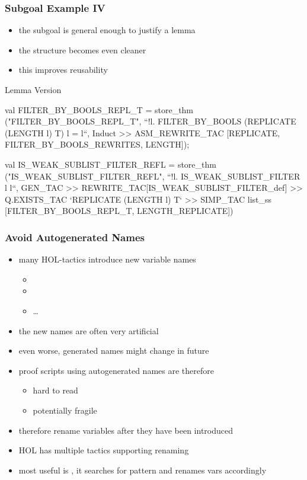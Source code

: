 \begin{frame}[fragile]
\frametitle{Subgoal Example IV}

\begin{itemize}
\item the subgoal is general enough to justify a lemma
\item the structure becomes even cleaner
\item this improves reusability
\end{itemize}

\begin{exampleblock}{Lemma Version}
\begin{semiverbatim}\scriptsize
val FILTER_BY_BOOLS_REPL_T = store_thm ("FILTER_BY_BOOLS_REPL_T",
  ``!l. FILTER_BY_BOOLS (REPLICATE (LENGTH l) T) l = l``,
Induct >> ASM_REWRITE_TAC [REPLICATE, FILTER_BY_BOOLS_REWRITES, LENGTH]);

val IS_WEAK_SUBLIST_FILTER_REFL = store_thm ("IS_WEAK_SUBLIST_FILTER_REFL",
  ``!l. IS_WEAK_SUBLIST_FILTER l l``,
GEN_TAC >> 
REWRITE_TAC[IS_WEAK_SUBLIST_FILTER_def] >>
Q.EXISTS_TAC `REPLICATE (LENGTH l) T` >>
SIMP_TAC list_ss [FILTER_BY_BOOLS_REPL_T, LENGTH_REPLICATE])
\end{semiverbatim}
\end{exampleblock}
\end{frame}



\begin{frame}[fragile]
\frametitle{Avoid Autogenerated Names}

\begin{itemize}
\item many HOL-tactics introduce new variable names
\begin{itemize}
\item {}
\item {}
\item \ldots
\end{itemize}
\item the new names are often very artificial
\item even worse, generated names might change in future
\item proof scripts using autogenerated names are therefore
\begin{itemize}
\item hard to read
\item potentially fragile
\end{itemize}
\item therefore rename variables after they have been introduced
\item HOL has multiple tactics supporting renaming
\item most useful is , it searches for pattern and renames vars accordingly
\end{itemize}
\end{frame}

